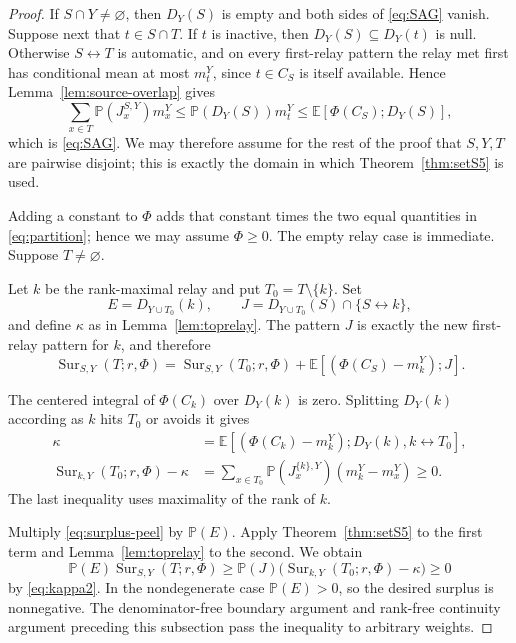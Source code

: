 \documentclass[11pt]{article}
\theoremstyle{definition}
\theoremstyle{remark}
\newcommand{\PP}{\mathbb P}
\newcommand{\EE}{\mathbb E}
\newcommand{\Sur}{\operatorname{Sur}}
\newcommand{\con}{\leftrightarrow}
\begin{document}
\begin{proof}
If $S\cap Y\ne\varnothing$, then $D_Y(S)$ is empty and both sides of
\eqref{eq:SAG} vanish.  Suppose next that $t\in S\cap T$.  If $t$ is
inactive, then $D_Y(S)\subseteq D_Y(t)$ is null.  Otherwise $S\con T$
is automatic, and on every first-relay pattern the relay met first has
conditional mean at most $m_t^Y$, since $t\in C_S$ is itself available.
Hence Lemma~\ref{lem:source-overlap} gives
\[
 \sum_{x\in T}\PP(J_x^{S,Y})m_x^Y
 \leq \PP(D_Y(S))m_t^Y
 \leq \EE[\Phi(C_S);D_Y(S)],
\]
which is \eqref{eq:SAG}.  We may therefore assume for the rest of the
proof that $S,Y,T$ are pairwise disjoint; this is exactly the domain in
which Theorem~\ref{thm:setS5} is used.

Adding a constant to $\Phi$ adds that constant times the two equal
quantities in \eqref{eq:partition}; hence we may assume $\Phi\geq0$.
The empty relay case is immediate.  Suppose $T\ne\varnothing$.

Let $k$ be the rank-maximal relay and put $T_0=T\setminus\{k\}$.  Set
\[
 E=D_{Y\cup T_0}(k),\qquad
 J=D_{Y\cup T_0}(S)\cap\{S\con k\},
\]
and define $\kappa$ as in Lemma~\ref{lem:toprelay}.  The pattern $J$ is
exactly the new first-relay pattern for $k$, and therefore
\begin{equation}\label{eq:surplus-peel}
 \Sur_{S,Y}(T;r,\Phi)
 =\Sur_{S,Y}(T_0;r,\Phi)
  +\EE[(\Phi(C_S)-m_k^Y);J].
\end{equation}

The centered integral of $\Phi(C_k)$ over $D_Y(k)$ is zero.  Splitting
$D_Y(k)$ according as $k$ hits $T_0$ or avoids it gives
\begin{align}
 \kappa
 &=\EE[(\Phi(C_k)-m_k^Y);D_Y(k),k\con T_0],\label{eq:kappa1}\\
 \Sur_{k,Y}(T_0;r,\Phi)-\kappa
 &=\sum_{x\in T_0}\PP(J_x^{\{k\},Y})
       (m_k^Y-m_x^Y)\geq0.\label{eq:kappa2}
\end{align}
The last inequality uses maximality of the rank of $k$.

Multiply \eqref{eq:surplus-peel} by $\PP(E)$.  Apply
Theorem~\ref{thm:setS5} to the first term and
Lemma~\ref{lem:toprelay} to the second.  We obtain
\[
 \PP(E)\Sur_{S,Y}(T;r,\Phi)
 \geq \PP(J)\bigl(\Sur_{k,Y}(T_0;r,\Phi)-\kappa\bigr)\geq0
\]
by \eqref{eq:kappa2}.  In the nondegenerate case $\PP(E)>0$, so the
desired surplus is nonnegative.  The denominator-free boundary argument
and rank-free continuity argument preceding this subsection pass the
inequality to arbitrary weights.
\end{proof}
\end{document}
